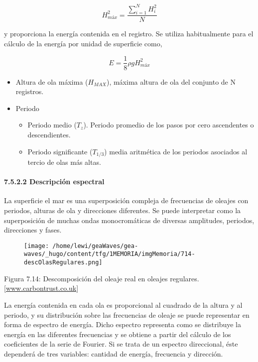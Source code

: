 \[H^2_{máx}=\frac{\sum_{i=1}^N H^2_i}{N}\]

y proporciona la energía contenida en el registro. Se utiliza
habitualmente para el cálculo de la energía por unidad de superficie
como,

\[E=\frac{1}{8}\rho g H^2_{máx}\]

\begin{itemize}
\item
  Altura de ola máxima (\(H_{MAX}\)), máxima altura de ola del conjunto
  de N registros.
\item
  Periodo

  \begin{itemize}
  \item
    Periodo medio (\(T_z\)). Periodo promedio de los pasos por cero
    ascendentes o descendientes.
  \item
    Periodo significante (\(T_{1/3}\)) media aritmética de los periodos
    asociados al tercio de olas más altas. 
  \end{itemize}
\end{itemize}

\paragraph{7.5.2.2 Descripción espectral}\label{header-n336}

La superficie el mar es una superposición compleja de frecuencias de
oleajes con periodos, alturas de ola y direcciones diferentes. Se puede
interpretar como la superposición de muchas ondas monocromáticas de
diversas amplitudes, periodos, direcciones y fases.

\begin{figure}
\centering
\texttt{[image: /home/lewi/geaWaves/gea-waves/\_hugo/content/tfg/1MEMORIA/imgMemoria/714-descOlasRegulares.png]}
\caption{}
\end{figure}

Figura 7.14: Descomposición del oleaje real en oleajes regulares.
{[}\url{www.carbontrust.co.uk}{]}

La energía contenida en cada ola es proporcional al cuadrado de la
altura y al periodo, y su distribución sobre las frecuencias de oleaje
se puede representar en forma de espectro de energía. Dicho espectro
representa como se distribuye la energía en las diferentes frecuencias y
se obtiene a partir del cálculo de los coeficientes de la serie de
Fourier. Si se trata de un espectro direccional, éste dependerá de tres
variables: cantidad de energía, frecuencia y dirección.

